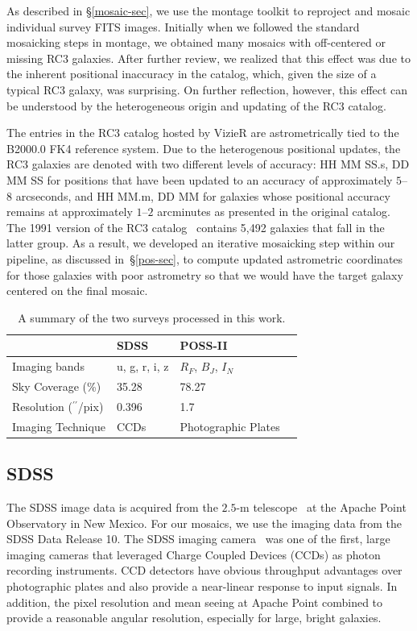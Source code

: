 \documentclass[authoryear, 12pt, 5p, times]{elsarticle}
\begin{document}
As described in \S\ref{mosaic-sec}, we use the montage toolkit to reproject and mosaic individual survey FITS images. Initially when we followed the standard mosaicking steps in montage, we obtained many mosaics with off-centered or missing RC3 galaxies. After further review, we realized that this effect was due to the inherent positional inaccuracy in the catalog, which, given the size of a typical RC3 galaxy, was surprising. On further reflection, however, this effect can be understood by the heterogeneous origin and updating of the RC3 catalog.

The entries in the RC3 catalog hosted by VizieR are astrometrically tied to the B2000.0 FK4 reference system. Due to the heterogenous positional updates, the RC3 galaxies are denoted with two different levels of accuracy: HH MM SS.s, DD MM SS for positions that have been updated  to an accuracy of approximately $5$--$8$ arcseconds, and  HH MM.m, DD MM for galaxies whose positional accuracy remains at approximately $1$--$2$ arcminutes as presented in the original catalog. The 1991 version of the RC3 catalog~\citep{rc31991} contains 5,492  galaxies that fall in the latter group. As a result, we developed an iterative mosaicking step within our pipeline, as discussed in~\S\ref{pos-sec}, to compute updated astrometric coordinates for those galaxies with poor astrometry so that we would have the target galaxy centered on the final mosaic.

\begin{table}
\footnotesize
    \begin{tabular}{llll}
    \hline
    ~                           & SDSS    & POSS-II             \\ \hline
    Imaging bands               & u, g, r, i, z  & $R_F$, $B_J$, $I_N$             \\
    Sky Coverage (\%)                & 35.28 & 78.27             \\
    Resolution ($^{\prime\prime}$/pix) & 0.396  & 1.7                 \\
    Imaging Technique           & CCDs    & Photographic Plates\\ \hline
    \end{tabular}
    \label{table:comptbl}
    \caption{{\footnotesize A summary of the two surveys processed in this work.}}
\end{table}

\subsection{SDSS}
The SDSS image data is acquired from the $2.5$-m telescope~\citep{sdss-tel} at the Apache Point Observatory in New Mexico. For our mosaics, we use the imaging data from the SDSS Data Release 10. The SDSS imaging camera~\citep{sdss-camera} was one of the first, large imaging cameras that leveraged Charge Coupled Devices (CCDs) as photon recording instruments. CCD detectors have obvious throughput advantages over photographic plates and also provide a near-linear response to input signals. In addition, the pixel resolution and mean seeing at Apache Point combined to provide a reasonable angular resolution, especially for large, bright galaxies. 
\end{document}
